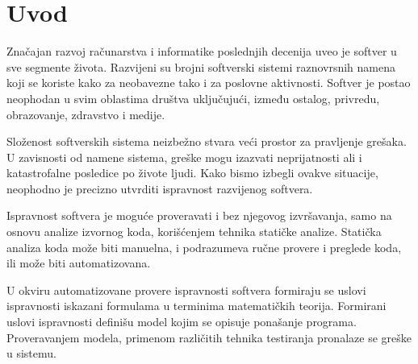 \documentclass[12pt,oneside]{memoir}
\begin{document}
\frontmatter
\naslovna
\komisija
\tableofcontents*

\mainmatter

\chapter{Uvod}

Značajan razvoj računarstva i informatike poslednjih decenija uveo je softver u sve segmente života. Razvijeni su brojni softverski sistemi raznovrsnih namena koji se koriste kako za neobavezne tako i za poslovne aktivnosti. Softver je postao neophodan u svim oblastima društva uključujući, između ostalog, privredu, obrazovanje, zdravstvo i medije. 

Složenost softverskih sistema neizbežno stvara veći prostor za pravljenje grešaka. U zavisnosti od namene sistema, greške mogu izazvati neprijatnosti ali i katastrofalne posledice po živote ljudi. Kako bismo izbegli ovakve situacije, neophodno je precizno utvrditi ispravnost razvijenog softvera. 

Ispravnost softvera je moguće proveravati i bez njegovog izvršavanja, samo na osnovu analize izvornog koda, korišćenjem tehnika statičke analize. Statička analiza koda može biti manuelna, i podrazumeva ručne provere i preglede koda, ili može biti automatizovana.  \par
U okviru automatizovane provere ispravnosti softvera formiraju se uslovi ispravnosti iskazani formulama u terminima matematičkih teorija. Formirani uslovi ispravnosti definišu model kojim se opisuje ponašanje programa. Proveravanjem modela, primenom različitih tehnika testiranja pronalaze se greške u sistemu.
\end{document}
